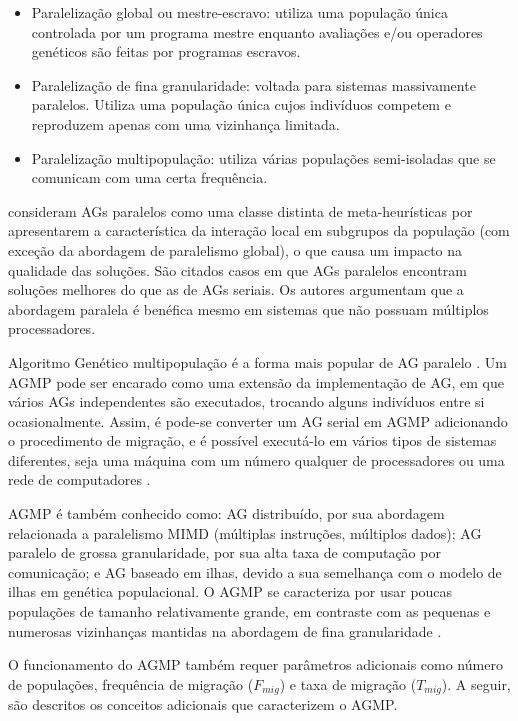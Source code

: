 \documentclass[fleqn,10pt]{SelfArx} %
\begin{document}
\begin{itemize}
\item Paralelização global ou mestre-escravo: utiliza uma população única controlada por um programa mestre enquanto avaliações e/ou operadores genéticos são feitas por programas escravos.

\item Paralelização de fina granularidade: voltada para sistemas massivamente paralelos. Utiliza uma população única cujos indivíduos competem e reproduzem apenas com uma vizinhança limitada.

\item Paralelização multipopulação: utiliza várias populações semi-isoladas que se comunicam com uma certa frequência.
\end{itemize}

\citeauthor{Alba:1999:SPD:315491.315495} consideram AGs paralelos como uma classe distinta de meta-heurísticas por apresentarem a característica da interação local em subgrupos da população (com exceção da abordagem de paralelismo global), o que causa um impacto na qualidade das soluções. São citados casos em que AGs paralelos encontram soluções melhores do que as de AGs seriais. Os autores argumentam que a abordagem paralela é benéfica mesmo em sistemas que não possuam múltiplos processadores.

Algoritmo Genético multipopulação é a forma mais popular de AG paralelo \cite{cantu1998survey}. Um AGMP pode ser encarado como uma extensão da implementação de AG, em que vários AGs independentes são executados, trocando alguns indivíduos entre si ocasionalmente. Assim, é pode-se converter um AG serial em AGMP adicionando o procedimento de migração, e é possível executá-lo em vários tipos de sistemas diferentes, seja uma máquina com um número qualquer de processadores ou uma rede de computadores \cite{cantu1998survey}.

AGMP é também conhecido como: AG distribuído, por sua abordagem relacionada a paralelismo MIMD (múltiplas instruções, múltiplos dados); AG paralelo de grossa granularidade, por sua alta taxa de computação por comunicação; e AG baseado em ilhas, devido a sua semelhança com o modelo de ilhas em genética populacional. O AGMP se caracteriza por usar poucas populações de tamanho relativamente grande, em contraste com as pequenas e numerosas vizinhanças mantidas na abordagem de fina granularidade \cite{cantu1998survey}.

O funcionamento do AGMP também requer parâmetros adicionais como número de populações, frequência de migração (\(F_{mig}\)) e taxa de migração (\(T_{mig}\)). A seguir, são descritos os conceitos adicionais que caracterizem o AGMP.
\end{document}

